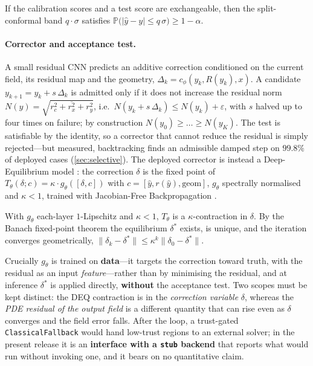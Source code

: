 \begin{proposition}
\label{prop:coverage}
If the calibration scores and a test score are exchangeable, then the split-conformal
band $q\cdot\sigma$ satisfies $\mathbb{P}\big(|\hat{y} - y| \le q\,\sigma\big) \ge
1-\alpha$.
\end{proposition}

\paragraph{Corrector and acceptance test.} A small residual CNN predicts an additive
correction conditioned on the current field, its residual map and the geometry,
$\Delta_k = c_\phi(y_k, R(y_k), x)$. A candidate $y_{k+1} = y_k + s\,\Delta_k$ is admitted
only if it does not increase the residual norm
$N(y) = \sqrt{\overline{r_c^2 + r_x^2 + r_y^2}}$, i.e.\ $N(y_k + s\,\Delta_k) \le N(y_k) +
\varepsilon$, with $s$ halved up to four times on failure; by construction
$N(y_0) \ge \dots \ge N(y_K)$. The test is satisfiable by the identity, so a corrector that
cannot reduce the residual is simply rejected---but measured, backtracking finds an
admissible damped step on $99.8\%$ of deployed cases (\autoref{sec:selective}). The
deployed corrector is instead a Deep-Equilibrium model \citep{bai2019deq}: the correction
$\delta$ is the fixed point of $T_\theta(\delta; c) = \kappa \cdot g_\theta([\delta, c])$
with $c = [\hat{y}, r(\hat{y}), \text{geom}]$, $g_\theta$ spectrally normalised
\citep{winston2020monotone} and $\kappa < 1$, trained with Jacobian-Free
Backpropagation \citep{fung2022jfb}.

\begin{proposition}
\label{prop:contraction}
With $g_\theta$ each-layer $1$-Lipschitz and $\kappa < 1$, $T_\theta$ is a
$\kappa$-contraction in $\delta$. By the Banach fixed-point theorem the equilibrium
$\delta^{*}$ exists, is unique, and the iteration converges geometrically,
$\|\delta_k - \delta^{*}\| \le \kappa^k \|\delta_0 - \delta^{*}\|$.
\end{proposition}

Crucially $g_\theta$ is trained on \textbf{data}---it targets the correction toward truth,
with the residual as an input \emph{feature}---rather than by minimising the residual, and
at inference $\delta^{*}$ is applied directly, \textbf{without} the acceptance test. Two
scopes must be kept distinct: the DEQ contraction is in the \emph{correction variable}
$\delta$, whereas the \emph{PDE residual of the output field} is a different quantity that
can rise even as $\delta$ converges and the field error falls. After the loop, a
trust-gated \texttt{ClassicalFallback} would hand low-trust regions to an external solver;
in the present release it is an \textbf{interface with a \texttt{stub} backend} that
reports what would run without invoking one, and it bears on no quantitative claim.


